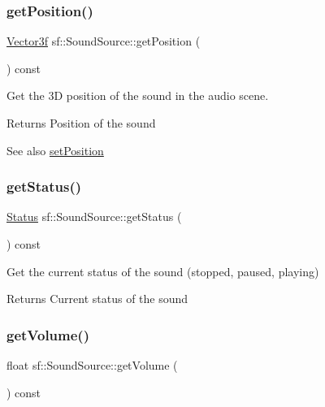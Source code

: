 \subsubsection{\texorpdfstring{get\+Position()}{getPosition()}}
{\footnotesize\ttfamily \hyperlink{classsf_1_1_vector3}{Vector3f} sf\+::\+Sound\+Source\+::get\+Position (\begin{DoxyParamCaption}{ }\end{DoxyParamCaption}) const}



Get the 3D position of the sound in the audio scene. 

\begin{DoxyReturn}{Returns}
Position of the sound
\end{DoxyReturn}
\begin{DoxySeeAlso}{See also}
\hyperlink{classsf_1_1_sound_source_a0480257ea25d986eba6cc3c1a6f8d7c2}{set\+Position} 
\end{DoxySeeAlso}
\mbox{\label{classsf_1_1_sound_source_a7e47072bd8b3982c708a6151f298d21a}} 
\subsubsection{\texorpdfstring{get\+Status()}{getStatus()}}
{\footnotesize\ttfamily \hyperlink{classsf_1_1_sound_source_ac43af72c98c077500b239bc75b812f03}{Status} sf\+::\+Sound\+Source\+::get\+Status (\begin{DoxyParamCaption}{ }\end{DoxyParamCaption}) const\hspace{0.3cm}{\ttfamily [protected]}}



Get the current status of the sound (stopped, paused, playing) 

\begin{DoxyReturn}{Returns}
Current status of the sound 
\end{DoxyReturn}
\mbox{\label{classsf_1_1_sound_source_a04243fb5edf64561689b1d58953fc4ce}} 
\subsubsection{\texorpdfstring{get\+Volume()}{getVolume()}}
{\footnotesize\ttfamily float sf\+::\+Sound\+Source\+::get\+Volume (\begin{DoxyParamCaption}{ }\end{DoxyParamCaption}) const}



